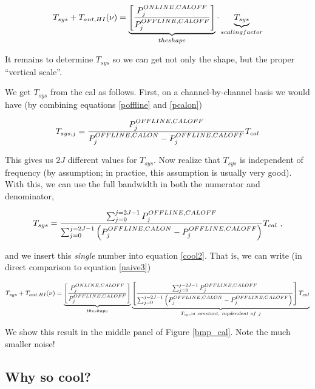 \documentclass[preprint]{aastex}
\begin{document}
\begin{equation} \label{cool2}
T_{sys} + T_{ant, HI}(\nu) = 
\underbrace{\left[ {P_j^{ONLINE, CALOFF} \over P_j^{OFFLINE, CALOFF}} 
\right]}_{the shape} \cdot
\underbrace{ T_{sys}}_{scaling factor}   
\end{equation}

\noindent It remains to determine $T_{sys}$ so we can
get not only the shape, but the proper ``vertical scale''. 

	We get $T_{sys}$ from the cal as follows. First, on a
channel-by-channel basis we would have (by combining equations
\ref{poffline} and \ref{pcalon})

\begin{equation} \label{cool3}
T_{sys,j} = {P_j^{OFFLINE,CALOFF} \over 
	P_j^{OFFLINE,CALON} - P_j^{OFFLINE,CALOFF} } T_{cal}
\end{equation}

\noindent This gives us $2J$ different values for $T_{sys}$. Now realize
that $T_{sys}$ is independent of frequency (by assumption; in practice,
this assumption is usually very good). With this, we can use the full
bandwidth in both the numerator and denominator, 

\begin{equation} \label{cool3a}
T_{sys} =  {\sum_{j=0}^{j=2J-1} P_j^{OFFLINE,CALOFF} \over 
             \sum_{j=0}^{j=2J-1} \left(
P_j^{OFFLINE,CALON} - P_j^{OFFLINE,CALOFF} \right) } T_{cal} \ ,
\end{equation}

\noindent and we insert this {\it single} number into equation
\ref{cool2}. That is, we can write (in direct comparison to equation
\ref{naive3})

\begin{small}
\begin{equation} \label{cool4}
T_{sys} + T_{ant, HI}(\nu) =
\underbrace{ \left[ {P_j^{ONLINE, CALOFF} \over P_j^{OFFLINE, CALOFF}}
\right] }_{the shape}
\underbrace{ \left[ 
{\sum_{j=0}^{j=2J-1} P_j^{OFFLINE,CALOFF} \over 
             \sum_{j=0}^{j=2J-1} \left(
P_j^{OFFLINE,CALON} - P_j^{OFFLINE,CALOFF}  \right) } \right] T_{cal}}
	_{T_{sys}:a \ constant,\ inpdendent \ of \ j}
\end{equation}
\end{small}

\noindent We show this result in the middle panel of Figure
\ref{bmp_cal}. Note the much smaller noise!


\subsection{Why so cool?}
\end{document}
